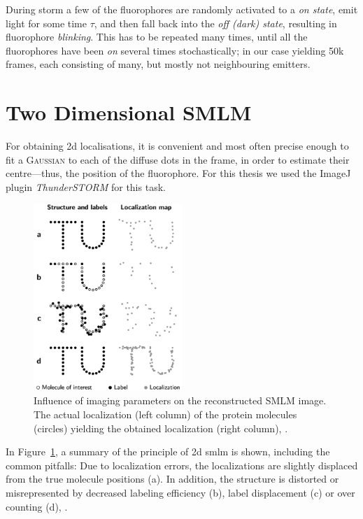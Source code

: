 \documentclass[11pt, a4paper, oneside, twocolumn]{report}
\newcommand{\e}{\emph}
\newcommand{\x}[1]{#1\index{#1}}
\begin{document}
During \gls{storm} a few of the fluorophores are randomly activated to
a \e{on state}, emit light for some time $\tau$, and then fall back
into the \e{off (dark) state}, resulting in fluorophore
\e{blinking}. This has to be repeated many times, until all the
fluorophores have been \e{on} several times stochastically; in our
case yielding 50k frames, each consisting of many, but mostly not
neighbouring emitters.


\section{Two Dimensional SMLM}

For obtaining 2d localisations, it is convenient and most often
precise enough to fit a \textsc{\x{Gaussian}} to each of the diffuse dots
in the frame, in order to estimate their centre---thus, the position
of the fluorophore. For this thesis we used the ImageJ plugin
\e{ThunderSTORM} \cite{omk14} for this task.

\begin{figure}[h]
  \centering \includegraphics[width=0.5\textwidth]{2dsmlm.png}
  \caption{Influence of imaging parameters on the reconstructed SMLM
    image. The actual localization (left column) of the protein
    molecules (circles) yielding the obtained localization (right
    column), \cite{smlm}.}
  \label{f:2dsmlm}
\end{figure}

In Figure~\ref{f:2dsmlm}, a summary of the principle of 2d \gls{smlm}
is shown, including the common pitfalls: Due to localization errors,
the localizations are slightly displaced from the true molecule
positions (a). In addition, the structure is distorted or
misrepresented by decreased labeling efficiency (b), label
displacement (c) or over counting (d), \cite{smlm}.
\end{document}
